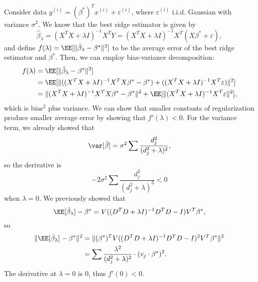 Consider data $y^{(i)} = (\beta^*)^Tx^{(i)} + \varepsilon^{(i)}$, where $\varepsilon^{(i)}$ i.i.d. Gaussian with variance $\sigma^2$. We know that the best ridge estimator is given by 
\[\hat{\beta}_{\lambda} = (X^TX + \lambda I)^{-1}X^TY = (X^TX + \lambda I)^{-1}X^T(X\beta^* + \varepsilon),\]
and define $f(\lambda) = \EE[\lVert \hat{\beta}_{\lambda} - \beta^*\rVert^2]$ to be the average error of the best ridge estimator and $\beta^*$. Then, we can employ bias-variance decomposition: 
\begin{align*}
	f(\lambda) &= \EE[\lVert \hat{\beta}_{\lambda} - \beta^*\rVert^2] \\
						 &= \EE[\lVert ((X^TX+\lambda I)^{-1}X^TX\beta^* - \beta^*) + ((X^TX + \lambda I)^{-1}X^T\varepsilon) \rVert^2] \\
						 &= \lVert (X^TX+\lambda I)^{-1}X^TX\beta^* - \beta^* \rVert^2 + \EE[\lVert (X^TX + \lambda I)^{-1}X^T\varepsilon\rVert^2], 
\end{align*}
which is bias$^2$ plus variance. We can show that smaller constants of regularization produce smaller average error by showing that $f'(\lambda) < 0$. For the variance term, we already showed that 
\[\var[\hat{\beta}] = \sigma^2\sum \frac{d_j^2}{(d_j^2 + \lambda)^2},\]
so the derivative is 
\[-2\sigma^2\sum \frac{d_j^2}{(d_j^2 + \lambda)^3} < 0\]
when $\lambda = 0$. We previously showed that 
\[\EE[\hat{\beta}_{\lambda}] - \beta^* = V((D^TD+\lambda I)^{-1}D^TD - I)V^T\beta^*,\]
so 
\begin{align*}
	\lVert \EE[\hat{\beta}_{\lambda}] - \beta^*\rVert^2 &= \lVert (\beta^*)^T V ((D^TD + \lambda I)^{-1}D^TD - I)^2 V^T \beta^*\rVert^2 \\
																											&= \sum \frac{\lambda^2}{(d_j^2+\lambda)^2} \cdot (v_j\cdot \beta^*)^2.
\end{align*}
The derivative at $\lambda=0$ is $0$, thus $f'(0) < 0$. 
